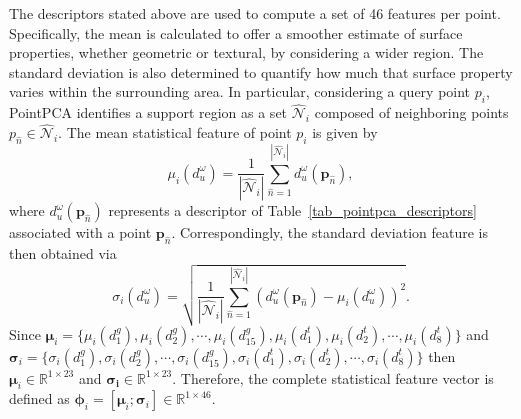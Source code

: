 \documentclass[final,3p,times,twocolumn]{elsarticle}
\begin{document}
The descriptors stated above are used to compute a set of 46 features per point. Specifically, the mean is calculated to offer a smoother estimate of surface properties, whether geometric or textural, by considering a wider region. The standard deviation is also determined to quantify how much that surface property varies within the surrounding area. In particular, considering a query point $p_i$, PointPCA identifies a support region as a set $\widehat{\mathcal{N}}_i$ composed of neighboring points $p_{\hat{n}} \in \widehat{\mathcal{N}}_i$. The mean statistical feature of point $p_i$ is given by
\begin{equation} \label{eq_mean_feature}
    \mu_i(d_u^\omega) = \frac{1}{|\widehat{\mathcal{N}}_i|} \sum_{\hat{n}=1}^{|\widehat{\mathcal{N}}_i|} d_u^\omega(\mathbf{p}_{\hat{n}}),
\end{equation}
where $d_u^\omega(\mathbf{p}_{\hat{n}})$ represents a descriptor of Table~\ref{tab_pointpca_descriptors} associated with a point $\mathbf{p}_{\hat{n}}$. Correspondingly, the standard deviation feature is then obtained via
\begin{equation} \label{eq_std_feature}
\sigma_i(d_u^\omega) = \sqrt{\frac{1}{|\widehat{\mathcal{N}}_i|} \sum_{\hat{n}=1}^{|\widehat{\mathcal{N}}_i|} (d_u^\omega(\mathbf{p}_{\hat{n}}) - \mu_i(d_u^\omega))^2}.
\end{equation}
Since $\mathbf{\mu}_i = \{ \mu_i(d_1^g), \allowbreak\mu_i(d_2^g), \allowbreak\cdots, \allowbreak\mu_i(d_{15}^g), \allowbreak\mu_i(d_1^t), \allowbreak\mu_i(d_2^t), \allowbreak\cdots, \allowbreak\mu_i(d_8^t) \}$ and $\mathbf{\sigma}_i = \{ \sigma_i(d_1^g), \allowbreak\sigma_i(d_2^g), \allowbreak\cdots, \allowbreak\sigma_i(d_{15}^g), \allowbreak\sigma_i(d_1^t), \allowbreak\sigma_i(d_2^t), \allowbreak\cdots, \allowbreak\sigma_i(d_8^t) \}$ then $ \mathbf{\mu}_i \in \mathbb{R}^{1 \times 23}$ and $ \mathbf{\sigma_i} \in \mathbb{R}^{1 \times 23}$. Therefore, the complete statistical feature vector is defined as $\mathbf{\phi}_i = \left[ \mathbf{\mu}_i; \mathbf{\sigma}_i \right] \in \mathbb{R}^{1 \times 46}$.
\end{document}
